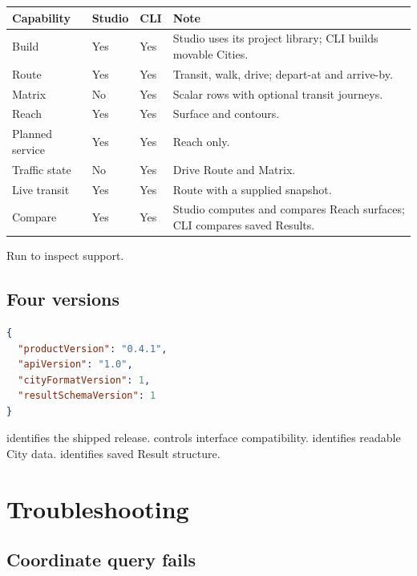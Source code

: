\documentclass[10pt,letterpaper]{article}
\begin{document}
\begin{center}
\begin{tabularx}{\linewidth}{P{1.55in} Z Z Y}
\toprule
\textbf{Capability} & \textbf{Studio} & \textbf{CLI} & \textbf{Note} \\
\midrule
Build & Yes & Yes & Studio uses its project library; CLI builds movable Cities. \\
Route & Yes & Yes & Transit, walk, drive; depart-at and arrive-by. \\
Matrix & No & Yes & Scalar rows with optional transit journeys. \\
Reach & Yes & Yes & Surface and contours. \\
Planned service & Yes & Yes & Reach only. \\
Traffic state & No & Yes & Drive Route and Matrix. \\
Live transit & Yes & Yes & Route with a supplied snapshot. \\
Compare & Yes & Yes & Studio computes and compares Reach surfaces; CLI compares saved Results. \\
\bottomrule
\end{tabularx}
\end{center}

Run  to inspect support.

\subsection{Four versions}

\begin{lstlisting}[language=json]
{
  "productVersion": "0.4.1",
  "apiVersion": "1.0",
  "cityFormatVersion": 1,
  "resultSchemaVersion": 1
}
\end{lstlisting}

 identifies the shipped release.  controls interface compatibility.  identifies readable City data.  identifies saved Result structure.

\section{Troubleshooting}

\subsection{Coordinate query fails}
\end{document}
